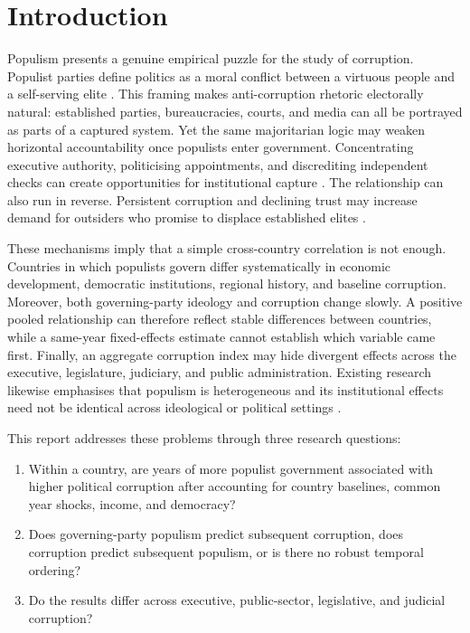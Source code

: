 \chapter{Introduction}
\label{chap:introduction}

Populism presents a genuine empirical puzzle for the study of corruption. Populist parties define
politics as a moral conflict between a virtuous people and a self-serving elite
\citep{mudde2004}. This framing makes anti-corruption rhetoric electorally natural: established
parties, bureaucracies, courts, and media can all be portrayed as parts of a captured system. Yet the
same majoritarian logic may weaken horizontal accountability once populists enter government.
Concentrating executive authority, politicising appointments, and discrediting independent checks can
create opportunities for institutional capture \citep{chesterley2018,batory2016}. The relationship can
also run in reverse. Persistent corruption and declining trust may increase demand for outsiders who
promise to displace established elites \citep{guriev2022,kubbe2020}.

These mechanisms imply that a simple cross-country correlation is not enough. Countries in which
populists govern differ systematically in economic development, democratic institutions, regional
history, and baseline corruption. Moreover, both governing-party ideology and corruption change
slowly. A positive pooled relationship can therefore reflect stable differences between countries,
while a same-year fixed-effects estimate cannot establish which variable came first. Finally, an
aggregate corruption index may hide divergent effects across the executive, legislature, judiciary,
and public administration. Existing research likewise emphasises that populism is heterogeneous and
its institutional effects need not be identical across ideological or political settings
\citep{huber2017,engler2024}.

This report addresses these problems through three research questions:

\begin{enumerate}[label=\textbf{RQ\arabic*.}]
  \item Within a country, are years of more populist government associated with higher political
  corruption after accounting for country baselines, common year shocks, income, and democracy?
  \item Does governing-party populism predict subsequent corruption, does corruption predict
  subsequent populism, or is there no robust temporal ordering?
  \item Do the results differ across executive, public-sector, legislative, and judicial corruption?
\end{enumerate}

